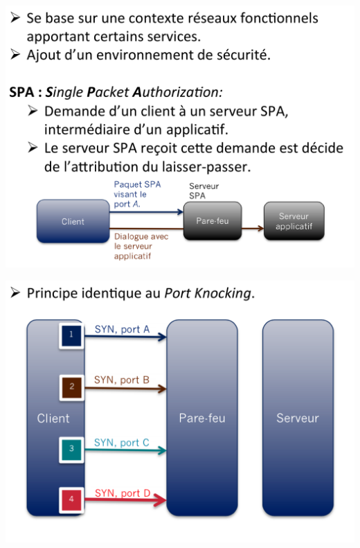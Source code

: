 \begin{frame}[fragile]
\centerline{\includegraphics[scale=0.35]{slide3}}
\end{frame}

\begin{frame}[fragile]
\centerline{\includegraphics[scale=0.35]{slide4}}
\end{frame}

